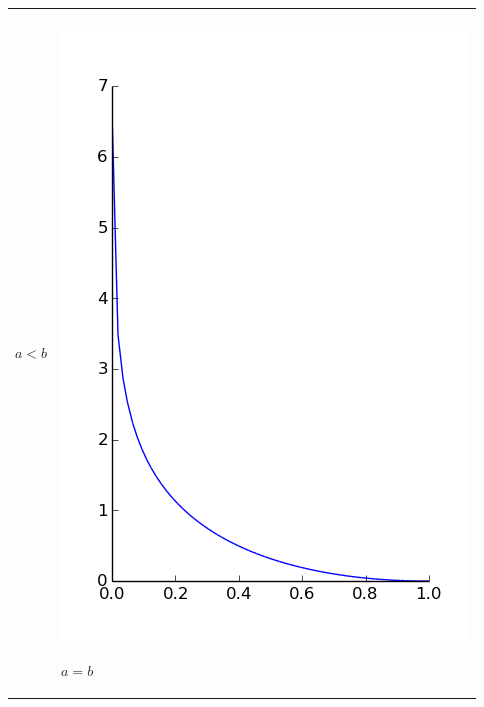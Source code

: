 \documentclass{article}
\begin{document}
\begin{tabular}{m{5cm} m{5cm}}
\begin{center}
$a<b$
\end{center}
&
\begin{center}
\includegraphics[scale=.3]{imagenes/perse_a_1_b_1.png}

$a=b$
\end{center}
\end{tabular}
\end{document}

